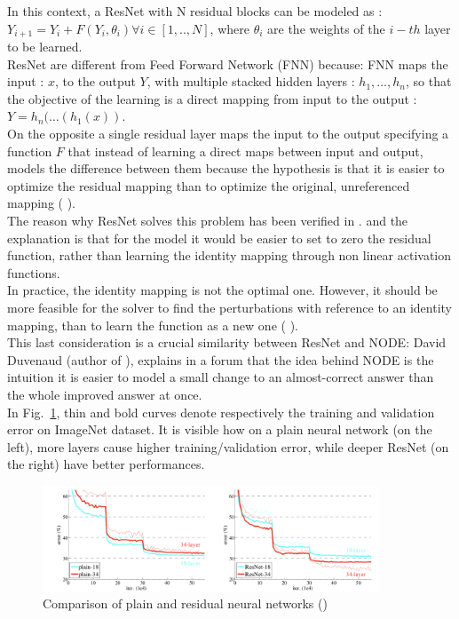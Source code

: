\documentclass[LaM,binding=0.6cm]{sapthesis}
\begin{document}
In this context, a ResNet with N residual blocks can be modeled as : $Y_{i+1} = Y_{i} +F(Y_{i},\theta_{i}) \forall i \in [1,..,N]$, where $\theta_{i}$ are the weights of the $i-th$ layer to be learned.\\ResNet are different from Feed Forward Network (FNN) because: FNN maps the input : $x$, to the output $Y$, with multiple stacked hidden layers : $h_1, \dots, h_n$, so that the objective of the learning is a direct mapping from input to the output : $Y=h_n(\dots (h_1(x))$.\\On the opposite a single residual layer maps the input to the output specifying a function $F$ that instead of learning a direct maps between input and output, models the difference between them because the hypothesis is that it is easier to optimize the residual mapping than to optimize the original, unreferenced mapping (\cite{DBLP:journals/corr/HeZRS15} ).\\The reason why ResNet solves this problem has been verified in \cite{DBLP:journals/corr/HeZRS15}. and the explanation is that for the model it would be easier to set to zero the residual function, rather than learning the identity mapping through non linear activation functions.\\In practice, the identity mapping is not the optimal one. However, it should be more feasible for the solver to find the perturbations with reference to an identity mapping, than to learn the function as a new one (\cite{DBLP:journals/corr/HeZRS15} ).\\This last consideration is a crucial similarity between ResNet and NODE: David Duvenaud (author of \cite{DBLP:journals/corr/abs-1806-07366}), explains in a forum that the idea behind NODE is the intuition it is easier to model a small change to an almost-correct answer than the whole improved answer at once.\\In Fig.~\ref{fig:degprob}, thin and bold curves denote respectively the training and validation error on ImageNet dataset. It is visible how on a plain neural network (on the left), more layers cause higher training/validation error, while deeper ResNet (on the right) have better performances.
\begin{figure}[H]  \centering
	\includegraphics[width=100mm,scale=0.7]{degprob.png}
	\caption{Comparison of plain and residual neural networks (\cite{DBLP:journals/corr/HeZRS15})}
	\label{fig:degprob}
\end{figure}
\end{document}
